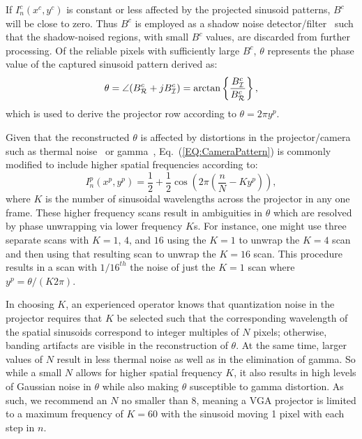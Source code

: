 \documentclass[10pt]{article}
\begin{document}
If $I_n^c(x^c, y^c)$ is constant or less affected by the projected sinusoid patterns, $B^c$ will be close to zero. Thus $B^c$ is employed as a shadow noise detector/filter~\cite{Li:97} such that the shadow-noised regions, with small $B^c$ values, are discarded from further processing. Of the reliable pixels with sufficiently large $B^c$, $\theta$ represents the phase value of the captured sinusoid pattern derived as:
\begin{equation}
    \theta = \angle ({B^c_{\cal R}}+j{B^c_{\cal I}}) =   \arctan \left\{\frac{B^c_{\cal I}}{B^c_{\cal R}}\right\},
    \label{EQ:Phase}
\end{equation}
which is used to derive the projector row according to $\theta=2\pi y^p$.

Given that the reconstructed $\theta$ is affected by distortions in the projector/camera such as thermal noise~\cite{Daley:98} or gamma~\cite{Liu:10}, Eq.~(\ref{EQ:CameraPattern}) is commonly modified to include higher spatial frequencies according to:
\begin{equation}
    I^p_n(x^p, y^p) = \frac{1}{2} + \frac{1}{2} \cos \left( 2\pi (\frac{n}{N} - K y^p)\right),
\end{equation}
where $K$ is the number of sinusoidal wavelengths across the projector in any one frame.  These higher frequency scans result in ambiguities in $\theta$ which are resolved by phase unwrapping via lower frequency $K$s.  For instance, one might use three separate scans with $K=1$, $4$, and $16$ using the $K=1$ to unwrap the $K=4$ scan and then using that resulting scan to unwrap the $K=16$ scan.  This procedure results in a scan with ${1/16}^{th}$ the noise of just the $K=1$ scan where $y^p = \theta/(K 2\pi)$.

In choosing $K$, an experienced operator knows that quantization noise in the projector requires that $K$ be selected such that the corresponding wavelength of the spatial sinusoids correspond to integer multiples of $N$ pixels; otherwise, banding artifacts are visible in the reconstruction of $\theta$.  At the same time, larger values of $N$ result in less thermal noise as well as in the elimination of gamma.  So while a small $N$ allows for higher spatial frequency $K$, it also results in high levels of Gaussian noise in $\theta$ while also making $\theta$ susceptible to gamma distortion.  As such, we recommend an $N$ no smaller than 8, meaning a VGA projector is limited to a maximum frequency of $K=60$ with the sinusoid moving 1 pixel with each step in $n$.
\end{document}
